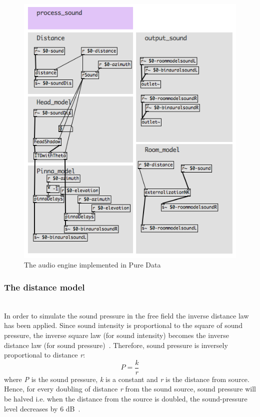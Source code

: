 \documentclass[journal]{IEEEtran}
\begin{document}
\begin{figure}[h!]
  \centering
    \includegraphics[scale=0.5]{graphics/audioengine.png}
  \caption{The audio engine implemented in Pure Data}
  \label{fig:augioengine}
\end{figure}



\subsubsection{The distance model}~\\
In order to simulate the sound pressure in the free field the inverse distance law has been applied. Since sound intensity is proportional to the square of sound pressure, the inverse square law (for sound intensity) becomes the inverse distance law (for sound pressure)~\cite{everest2009master}. Therefore, sound pressure is inversely proportional to distance \textit{r}:
\begin{equation}\label{eq:soundpressure}
P = \frac{k}{r}
\end{equation}
where \textit{P} is the sound pressure, \textit{k} is a constant and \textit{r} is the distance from source.
Hence, for every doubling of distance \textit{r} from the sound source, sound pressure will be halved i.e. when the distance from the source is doubled, the sound-pressure level decreases by 6 dB~\cite{everest2009master}.
\end{document}
